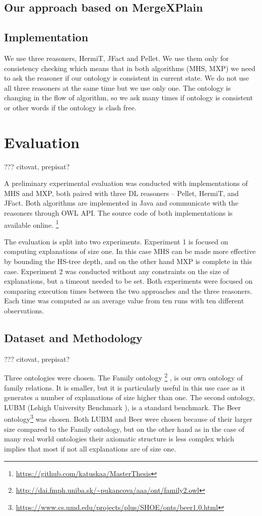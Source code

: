 \documentclass[12pt,a4paper]{article}
\begin{document}
\subsection{Our approach based on MergeXPlain}

\subsection{Implementation}
We use three reasoners, HermiT, JFact and Pellet. We use them only for consistency checking which means that in both algorithms (MHS, MXP) we need to ask the reasoner if our ontology is consistent in current state. We do not use all three reasoners at the same time but we use only one. The ontology is changing in the flow of algorithm, so we ask many times if ontology is consistent or other words if the ontology is clash free.


\section{Evaluation}
??? citovat, prepisat?

A preliminary experimental evaluation was conducted with implementations of
MHS and MXP, both paired with three  DL reasoners -- Pellet, HermiT, and
JFact. Both algorithms are implemented in Java and communicate with the
reasoners through OWL API.
%
The source code of both implementations is available online.%
\footnote{\url{https://github.com/katuskaa/MasterThesis}}

The evaluation is split into two experiments. Experiment 1 is focused on
computing explanations of size one. In this case MHS can be
made more effective by bounding the HS-tree depth, and on the other hand
MXP is complete in this case. Experiment 2 was conducted without any
constraints on the size of explanations, but a timeout needed to be set. Both
experiments were focused on comparing execution times between the two
approaches and the three reasoners. Each time was computed as an average
value from ten runs with ten different observations.

\subsection{Dataset and Methodology}
??? citovat, prepisat?

Three ontologies were chosen. The Family ontology%
\footnote{\url{http://dai.fmph.uniba.sk/~pukancova/aaa/ont/family2.owl}}%
, is our own ontology of family relations. It is smaller,
but it is particularly useful in this use case as it generates a number of
explanations of size higher than one. The second ontology, LUBM (Lehigh University
Benchmark \cite{LUBM}), is a standard benchmark. The Beer
ontology\footnote{\url{https://www.cs.umd.edu/projects/plus/SHOE/onts/beer1.0.html}}
was chosen. Both LUBM and Beer were chosen because of their larger size compared to the Family ontology, but on the other hand as in the case of many real world ontologies their axiomatic structure is less complex which implies that most if not all explanations are
of size one.
\end{document}
